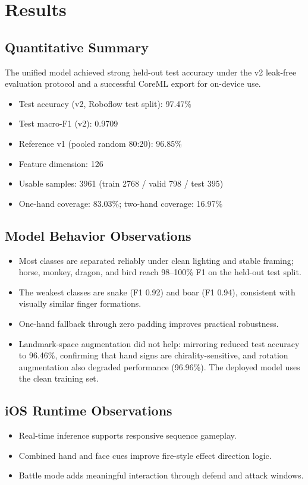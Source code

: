 \chapter{Results}

\section{Quantitative Summary}
The unified model achieved strong held-out test accuracy under the v2
leak-free evaluation protocol and a successful CoreML export for on-device
use.

\begin{itemize}[leftmargin=2em]
\item Test accuracy (v2, Roboflow test split): 97.47\%
\item Test macro-F1 (v2): 0.9709
\item Reference v1 (pooled random 80:20): 96.85\%
\item Feature dimension: 126
\item Usable samples: 3961 (train 2768 / valid 798 / test 395)
\item One-hand coverage: 83.03\%; two-hand coverage: 16.97\%
\end{itemize}

\section{Model Behavior Observations}
\begin{itemize}[leftmargin=2em]
\item Most classes are separated reliably under clean lighting and stable framing; horse, monkey, dragon, and bird reach 98--100\% F1 on the held-out test split.
\item The weakest classes are snake (F1 0.92) and boar (F1 0.94), consistent with visually similar finger formations.
\item One-hand fallback through zero padding improves practical robustness.
\item Landmark-space augmentation did not help: mirroring reduced test accuracy to 96.46\%, confirming that hand signs are chirality-sensitive, and rotation augmentation also degraded performance (96.96\%). The deployed model uses the clean training set.
\end{itemize}

\section{iOS Runtime Observations}
\begin{itemize}[leftmargin=2em]
\item Real-time inference supports responsive sequence gameplay.
\item Combined hand and face cues improve fire-style effect direction logic.
\item Battle mode adds meaningful interaction through defend and attack windows.
\end{itemize}

